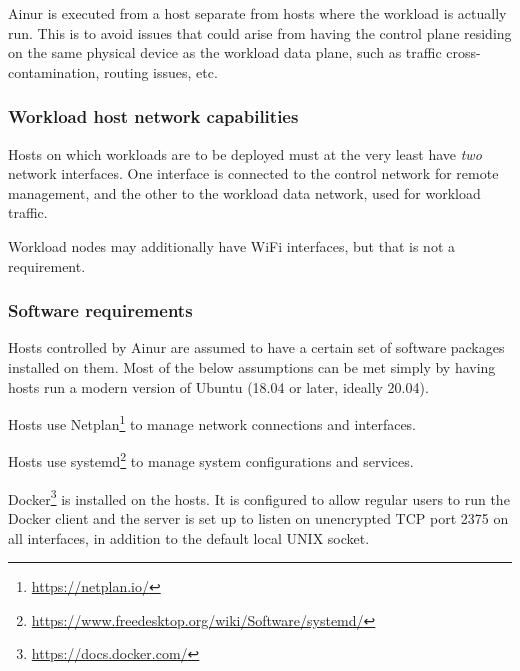 Ainur is executed from a host separate from hosts where the workload is actually run.
This is to avoid issues that could arise from having the control plane residing on the same physical device as the workload data plane, such as traffic cross-contamination, routing issues, etc.

\subsubsection{Workload host network capabilities}

Hosts on which workloads are to be deployed must at the very least have \emph{two} network interfaces. 
One interface is connected to the control network for remote management, and the other to the workload data network, used for workload traffic.

Workload nodes may additionally have WiFi interfaces, but that is not a requirement.

\subsubsection{Software requirements}

Hosts controlled by Ainur are assumed to have a certain set of software packages installed on them.
Most of the below assumptions can be met simply by having hosts run a modern version of Ubuntu (18.04 or later, ideally 20.04).

\begin{description}[style=unboxed]


    \item[Netplan]
    
    Hosts use Netplan\footnote{\url{https://netplan.io/}} to manage network connections and interfaces.
    
    \item[systemd]
    
    Hosts use systemd\footnote{\url{https://www.freedesktop.org/wiki/Software/systemd/}} to manage system configurations and services.
    
    \item[Docker]
    
    Docker\footnote{\url{https://docs.docker.com/}} is installed on the hosts.
    It is configured to allow regular users to run the Docker client and the server is set up to listen on unencrypted \gls{TCP} port \num{2375} on all interfaces, in addition to the default local UNIX socket.
\end{description}

